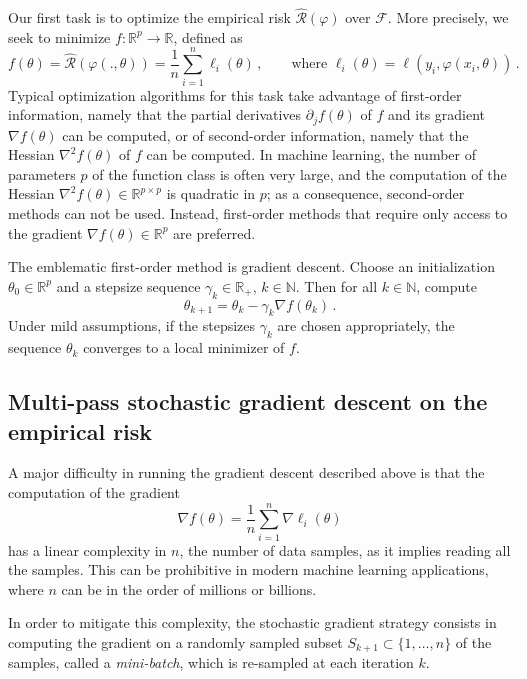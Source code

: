 \documentclass[11pt,reqno]{article}
\newcommand{\N}{\mathbb{N}}
\newcommand{\R}{\mathbb{R}}
\newcommand{\cF}{\mathcal{F}}
\newcommand{\cR}{\mathcal{R}}
\numberwithin{equation}{section}
\theoremstyle{plain}
\theoremstyle{definition}
\theoremstyle{remark}
\begin{document}
Our first task is to optimize the empirical risk $\widehat{\cR}(\varphi)$ over $\cF$. More precisely, we seek to minimize $f:\R^p \to \R$, defined as 
\begin{equation*}
	f(\theta) = \widehat{\cR}(\varphi(.,\theta)) = \frac{1}{n} \sum_{i=1}^n \ell_i(\theta) \, , \qquad \text{where }   \ell_i(\theta) = \ell(y_i, \varphi(x_i, \theta)) \, .
\end{equation*}
Typical optimization algorithms for this task take advantage of first-order information, namely that the partial derivatives $\partial_j f(\theta)$ of $f$ and its gradient $\nabla f(\theta)$ can be computed, or of second-order information, namely that the Hessian $\nabla^2 f(\theta)$ of $f$ can be computed. In machine learning, the number of parameters $p$ of the function class is often very large, and the computation of the Hessian $\nabla^2 f(\theta) \in \R^{p \times p}$ is quadratic in $p$; as a consequence, second-order methods can not be used. Instead, first-order methods that require only access to the gradient $\nabla f(\theta) \in \R^p$ are preferred. 

The emblematic first-order method is gradient descent. Choose an initialization $\theta_0 \in \R^p$ and a stepsize sequence $\gamma_k \in \R_+$, $k \in \N$. Then for all $k \in \N$, compute 
\begin{equation}
	\label{eq:gd}
	\theta_{k+1} = \theta_k - \gamma_{k} \nabla f(\theta_k) \, .
\end{equation}
Under mild assumptions, if the stepsizes $\gamma_k$ are chosen appropriately, the sequence $\theta_k$ converges to a local minimizer of $f$. 

\subsection{Multi-pass stochastic gradient descent on the empirical risk}
\label{sec:sgd-empirical}

A major difficulty in running the gradient descent described above is that the computation of the gradient 
\begin{equation*}
	\nabla f(\theta) = \frac{1}{n} \sum_{i=1}^n \nabla \ell_i(\theta)
\end{equation*}
has a linear complexity in $n$, the number of data samples, as it implies reading all the samples. This can be prohibitive in modern machine learning applications, where $n$ can be in the order of millions or billions. 

In order to mitigate this complexity, the stochastic gradient strategy consists in computing the gradient on a randomly sampled subset $S_{k+1} \subset \{1, \dots, n \}$ of the samples, called a \emph{mini-batch}, which is re-sampled at each iteration $k$. 
\end{document}
